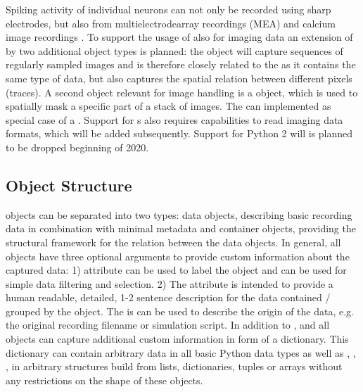 Spiking activity of individual neurons can not only be recorded using sharp electrodes, but also  from multielectrodearray recordings (MEA) and calcium image recordings \citep{Kelly_2007, Shew_2010}. To support the usage of  also for imaging data an extension of  by two additional object types is planned: the  object will capture sequences of regularly sampled images and is therefore closely related to the  as it contains the same type of data, but also captures the spatial relation between different pixels (traces). A second object relevant for image handling is a  object, which is used to spatially mask a specific part of a stack of images. The  can implemented as special case of a . Support for s also requires capabilities to read imaging data formats, which will be added subsequently.
Support for Python 2 will is planned to be dropped beginning of 2020.


\subsection{ Object Structure}
 objects can be separated into two types: data objects, describing basic recording data in combination with minimal metadata and container objects, providing the structural framework for the relation between the data objects. In general, all  objects have three optional arguments to provide custom information about the captured data: 1)  attribute can be used to label the object and can be used for simple data filtering and selection. 2) The  attribute is intended to provide a human readable, detailed, 1-2 sentence description for the data contained / grouped by the  object. The  is can be used to describe the origin of the data, e.g. the original recording filename or simulation script. In addition to ,  and  all  objects can capture additional custom information in form of a  dictionary. This dictionary can contain arbitrary data in all basic Python data types as well as , , ,  in arbitrary structures build from lists, dictionaries, tuples or  arrays without any restrictions on the shape of these objects.


